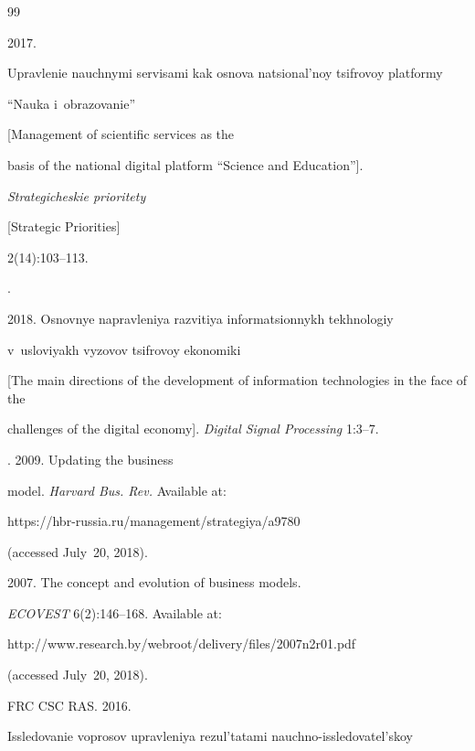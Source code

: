 {{\begin{thebibliography}{99}


 2017. 


Upravlenie nauchnymi servisami kak osnova natsional'noy tsifrovoy platformy


``Nauka i~obrazovanie''


[Management of scientific services as the 


basis of the national digital platform ``Science and Education''].


 \textit{Strategicheskie prioritety}


 [Strategic Priorities] 


2(14):103--113.




. 


2018.  Osnovnye napravleniya razvitiya informatsionnykh tekhnologiy


v~usloviyakh vyzovov tsifrovoy ekonomiki


[The main directions of the development of information technologies in the face of the 


challenges of the digital economy]. \textit{Digital Signal Processing} 1:3--7.




. 2009. Updating the business 


model. \textit{Harvard Bus. Rev.} Available at: {\sf  


https://hbr-russia.ru/management/\linebreak strategiya/a9780} (accessed July~20, 2018).




 2007. The concept and evolution of business models. 


\textit{ECOVEST} 6(2):146--168. Available at: {\sf 


http://www.research.by/webroot/delivery/\linebreak  files/2007n2r01.pdf} (accessed July~20, 2018).




FRC CSC RAS. 2016. 


Issledovanie voprosov upravleniya rezul'tatami nauchno-issledovatel'skoy



\end{thebibliography}}}
